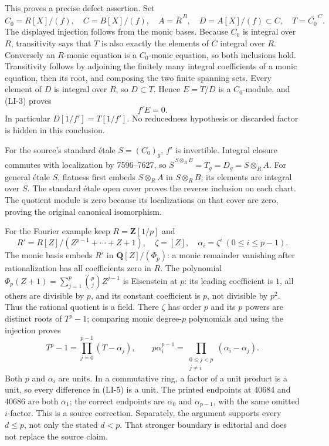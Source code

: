 This proves a precise defect assertion. Set \[
C_0=R[X]/(f),\quad C=B[X]/(f),\quad
A=\overline R^{\,B},\quad D=A[X]/(f)\subset C,\quad
T=\overline {C_0}^{\,C}.
\] The displayed injection follows from the monic bases. Because \(C_0\) is integral over \(R\), transitivity says that \(T\) is also exactly the elements of \(C\) integral over \(R\). Conversely an \(R\)-monic equation is a \(C_0\)-monic equation, so both inclusions hold. Transitivity follows by adjoining the finitely many integral coefficients of a monic equation, then its root, and composing the two finite spanning sets. Every element of \(D\) is integral over \(R\), so \(D\subset T\). Hence \(E=T/D\) is a \(C_0\)-module, and (LI-3) proves \[
f'E=0.
\tag{LI-4}
\] In particular \(D[1/f']=T[1/f']\). No reducedness hypothesis or discarded factor is hidden in this conclusion.

For the source's standard étale \(S=(C_0)_g\), \(f'\) is invertible. Integral closure commutes with localization by 7596--7627, so \(\overline S^{\,S\otimes_RB}=T_g=D_g=S\otimes_RA\). For general étale \(S\), flatness first embeds \(S\otimes_RA\) in \(S\otimes_RB\); its elements are integral over \(S\). The standard étale open cover proves the reverse inclusion on each chart. The quotient module is zero because its localizations on that cover are zero, proving the original canonical isomorphism.

For the Fourier example keep \(R=\mathbf Z[1/p]\) and \[
R'=R[Z]/(Z^{p-1}+\cdots+Z+1),\quad \zeta=[Z],\quad
\alpha_i=\zeta^i\ (0\leq i\leq p-1).
\] The monic basis embeds \(R'\) in \(\mathbf Q[Z]/(\Phi_p)\): a monic remainder vanishing after rationalization has all coefficients zero in \(R\). The polynomial \(\Phi_p(Z+1)=\sum_{j=1}^p\binom pj Z^{j-1}\) is Eisenstein at \(p\): its leading coefficient is \(1\), all others are divisible by \(p\), and its constant coefficient is \(p\), not divisible by \(p^2\). Thus the rational quotient is a field. There \(\zeta\) has order \(p\) and its \(p\) powers are distinct roots of \(T^p-1\); comparing monic degree-\(p\) polynomials and using the injection proves \[
T^p-1=\prod_{j=0}^{p-1}(T-\alpha_j),\qquad
p\alpha_i^{p-1}=\prod_{\substack{0\leq j<p\\j\ne i}}
(\alpha_i-\alpha_j).
\tag{LI-5}
\] Both \(p\) and \(\alpha_i\) are units. In a commutative ring, a factor of a unit product is a unit, so every difference in (LI-5) is a unit. The printed endpoints at 40684 and 40686 are both \(\alpha_1\); the correct endpoints are \(\alpha_0\) and \(\alpha_{p-1}\), with the same omitted \(i\)-factor. This is a source correction. Separately, the argument supports every \(d\leq p\), not only the stated \(d<p\). That stronger boundary is editorial and does not replace the source claim.

